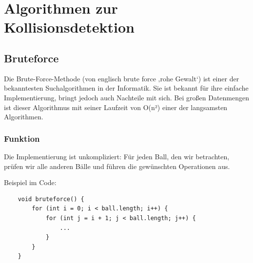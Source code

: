 \documentclass[12pt,a4paper]{article}
\begin{document}
		

		
	
	\section{Algorithmen zur Kollisionsdetektion}
	
\subsection{Bruteforce}

Die Brute-Force-Methode (von englisch brute force ‚rohe Gewalt‘) \cite{Bruteforce} ist einer der bekanntesten Suchalgorithmen in der Informatik. Sie ist bekannt für ihre einfache Implementierung, bringt jedoch auch Nachteile mit sich. Bei großen Datenmengen ist dieser Algorithmus mit seiner Laufzeit von  O(n²) einer der langsamsten Algorithmen.

\subsubsection{Funktion}

Die Implementierung ist unkompliziert: Für jeden Ball, den wir betrachten, prüfen wir alle anderen Bälle und führen die gewünschten Operationen aus.

\vspace{0.5cm}
Beispiel im Code:

\begin{verbatim}
	void bruteforce() {
		for (int i = 0; i < ball.length; i++) {
			for (int j = i + 1; j < ball.length; j++) {
				...
			}
		}
	}
\end{verbatim}
	
	
	
	
	
	
	
	
\end{document}
